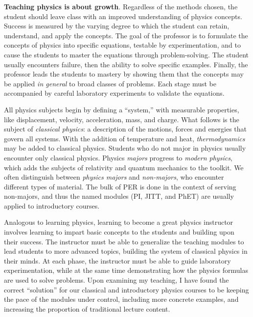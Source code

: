 \documentclass[../../main.tex]{subfiles}
\begin{document}
\textbf{Teaching physics is about growth}.  Regardless of the methods chosen, the student should leave class with an improved understanding of physics concepts.  Success is measured by the varying degree to which the student can retain, understand, and apply the concepts.  The goal of the professor is to formulate the concepts of physics into specific equations, testable by experimentation, and to cause the students to master the equations through problem-solving.  The student usually encounters failure, then the ability to solve specific examples.  Finally, the professor leads the students to mastery by showing them that the concepts may be applied \textit{in general} to broad classes of problems. Each stage must be accompanied by careful laboratory experiments to validate the equations. \\ \hspace{0.1cm}

All physics subjects begin by defining a ``system,'' with measurable properties, like displacement, velocity, acceleration, mass, and charge.  What follows is the subject of \textit{classical physics}: a description of the motions, forces and energies that govern all systems.  With the addition of temperature and heat, \textit{thermodynamics} may be added to classical physics.  Students who do not major in physics usually encounter only classical physics.  Physics \textit{majors} progress to \textit{modern physics}, which adds the subjects of relativity and quantum mechanics to the toolkit.  We often distinguish between \textit{physics majors} and \textit{non-majors}, who encounter different types of material.  The bulk of PER is done in the context of serving non-majors, and thus the named modules (PI, JITT, and PhET) are usually applied to introductory courses.  \\ \hspace{0.1cm}

Analogous to learning physics, learning to become a great physics instructor involves learning to impart basic concepts to the students and building upon their success.  The instructor must be able to generalize the teaching modules to lead students to more advanced topics, building the system of classical physics in their minds.  At each phase, the instructor must be able to guide laboratory experimentation, while at the same time demonstrating how the physics formulas are used to solve problems.  Upon examining my teaching, I have found the correct ``solution'' for our classical and introductory physics courses to be keeping the pace of the modules under control, including more concrete examples, and increasing the proportion of traditional lecture content.  \\ \hspace{0.1cm}
\end{document}
